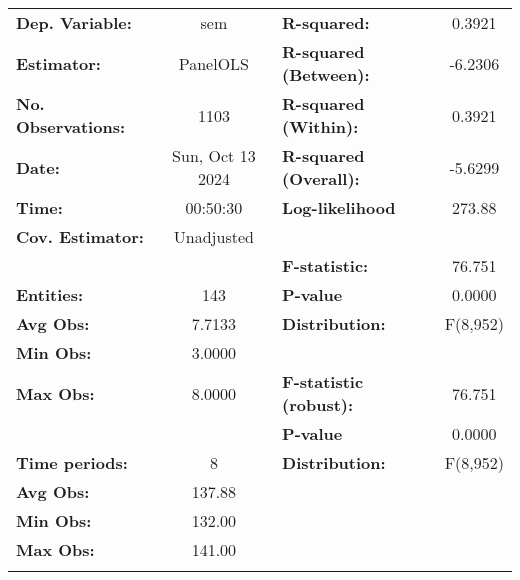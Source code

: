 \documentclass{article}
\begin{document}
\begin{center}
\begin{tabular}{lclc}
\toprule
\textbf{Dep. Variable:}    &        sem         & \textbf{  R-squared:         }   &      0.3921      \\
\textbf{Estimator:}        &      PanelOLS      & \textbf{  R-squared (Between):}  &     -6.2306      \\
\textbf{No. Observations:} &        1103        & \textbf{  R-squared (Within):}   &      0.3921      \\
\textbf{Date:}             &  Sun, Oct 13 2024  & \textbf{  R-squared (Overall):}  &     -5.6299      \\
\textbf{Time:}             &      00:50:30      & \textbf{  Log-likelihood     }   &      273.88      \\
\textbf{Cov. Estimator:}   &     Unadjusted     & \textbf{                     }   &                  \\
\textbf{}                  &                    & \textbf{  F-statistic:       }   &      76.751      \\
\textbf{Entities:}         &        143         & \textbf{  P-value            }   &      0.0000      \\
\textbf{Avg Obs:}          &       7.7133       & \textbf{  Distribution:      }   &     F(8,952)     \\
\textbf{Min Obs:}          &       3.0000       & \textbf{                     }   &                  \\
\textbf{Max Obs:}          &       8.0000       & \textbf{  F-statistic (robust):} &      76.751      \\
\textbf{}                  &                    & \textbf{  P-value            }   &      0.0000      \\
\textbf{Time periods:}     &         8          & \textbf{  Distribution:      }   &     F(8,952)     \\
\textbf{Avg Obs:}          &       137.88       & \textbf{                     }   &                  \\
\textbf{Min Obs:}          &       132.00       & \textbf{                     }   &                  \\
\textbf{Max Obs:}          &       141.00       & \textbf{                     }   &                  \\
\textbf{}                  &                    & \textbf{                     }   &                  \\
\bottomrule

\end{tabular}
\end{center}
\end{document}
